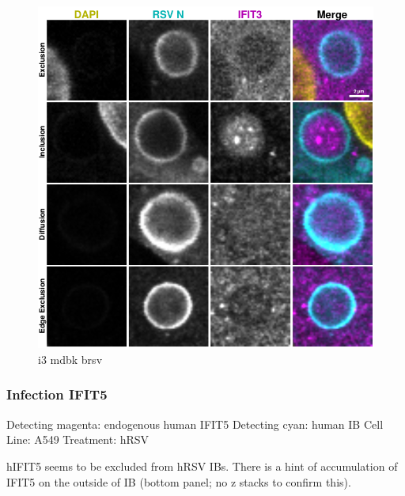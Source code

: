 \begin{figure}
    \centering
    \includegraphics[width=1\linewidth]{09. Chapter 4/Figs/02. Infection/06. mdbk i3.pdf}
    \caption[i3 mdbk brsv]{i3 mdbk brsv}
    \label{fig:i3 mdbk brsv}
\end{figure}

\subsubsection{Infection IFIT5}
Detecting magenta: endogenous human IFIT5 \newline
Detecting cyan: human IB \newline
Cell Line: A549 \newline
Treatment: hRSV \newline

hIFIT5 seems to be excluded from hRSV IBs. There is a hint of accumulation of IFIT5 on the outside of IB (bottom panel; no z stacks to confirm this). 

